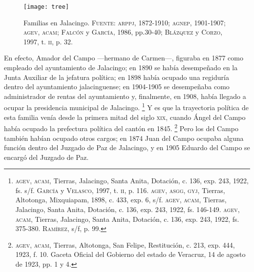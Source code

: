 \documentclass[14pt,twoside,final]{extbook} %
\let\oldfootnote\footnote
\renewcommand\footnote[1]{%
\oldfootnote{\hspace{1mm}#1}}
\begin{document}
\begin{sidewaysfigure}
\centering
\texttt{[image: tree]}
\caption[Familias en Jalacingo]{Familias en Jalacingo. \textsc{Fuente:} \textsc{arppj, 1872-1910}; \textsc{agnep}, 1901-1907; \textsc{agev, acam}; \textsc{Falcón} y \textsc{García}, 1986, pp.30-40; \textsc{Blázquez} y \textsc{Corzo}, 1997, t. \textsc{ii}, p. 32.}
\label{fig:arbol-genealogico}
\end{sidewaysfigure}
En efecto, Amador del Campo ---hermano de Carmen---, figuraba en 1877 como empleado del ayuntamiento de Jalacingo; en 1890 se había desempeñado en la Junta Auxiliar de la jefatura política; en 1898 había ocupado una regiduría dentro del ayuntamiento jalacinguense; en 1904-1905 se desempeñaba como administrador de rentas del ayuntamiento y, finalmente, en 1908, había llegado a ocupar la presidencia municipal de Jalacingo.\footnote{\textsc{agev, acam}, Tierras, Jalacingo, Santa Anita, Dotación, c. 136, exp. 243, 1922, fs. s/f. \textsc{García} y \textsc{Velasco}, 1997, t. \textsc{ii}, p. 116. \textsc{agev, asgg, gyj}, Tierras, Altotonga, Mixquiapam, 1898, c. 433, exp. 6, s/f. \textsc{agev, acam}, Tierras, Jalacingo, Santa Anita, Dotación, c. 136, exp. 243, 1922, fs. 146-149. \textsc{agev, acam}, Tierras, Jalacingo, Santa Anita, Dotación, c. 136, exp. 243, 1922, fs. 375-380. \textsc{Ramírez}, s/f, p. 99.} Y es que la trayectoria política de esta familia venía desde la primera mitad del siglo \textsc{xix}, cuando Ángel del Campo había ocupado la prefectura política del cantón en 1845.\footnote{\textsc{agev, acam}, Tierras, Altotonga, San Felipe, Restitución, c. 213, exp. 444, 1923, f. 10. Gaceta Oficial del Gobierno del estado de Veracruz, 14 de agosto de 1923, pp. 1 y 4.} Pero los del Campo también habían ocupado otros cargos; en 1874 Juan del Campo ocupaba alguna función dentro del Juzgado de Paz de Jalacingo, y en 1905 Eduardo del Campo se encargó del Juzgado de Paz.
\end{document}
